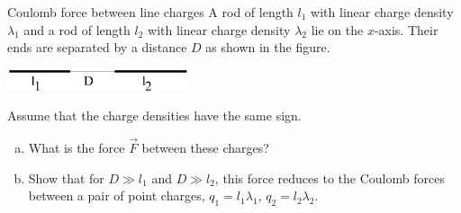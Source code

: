 \documentclass{esg8022pset}
\begin{document}
\begin{problem}{Coulomb force between line charges}
  A rod of length $l_1$ with linear charge density $\lambda_1$ and a rod of length $l_2$ with linear charge density $\lambda_2$ lie on the $x$-axis.  Their ends are separated by a distance $D$ as shown in the figure.
  \begin{center}\includegraphics[width=0.4\textwidth]{ps01_9}\end{center}
  Assume that the charge densities have the same sign.
  \begin{enumerate}[(a)]
    \item What is the force $\vec F$ between these charges?
    \item Show that for $D \gg l_1$ and $D \gg l_2$, this force reduces to the Coulomb forces between a pair of point charges, $q_1 = l_1\lambda_1$, $q_2 = l_2\lambda_2$.
  \end{enumerate}
\end{problem}
\end{document}
